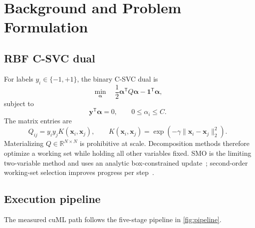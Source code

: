 \section{Background and Problem Formulation}

\subsection{RBF C-SVC dual}

For labels $y_i\in\{-1,+1\}$, the binary C-SVC dual is
\begin{equation}
  \min_{\bm{\alpha}}
  \quad
  \frac{1}{2}\bm{\alpha}^{\mathsf T}Q\bm{\alpha}
  -\bm{1}^{\mathsf T}\bm{\alpha},
  \label{eq:dual}
\end{equation}
subject to
\begin{equation}
  \bm{y}^{\mathsf T}\bm{\alpha}=0,
  \qquad
  0\leq \alpha_i\leq C.
  \label{eq:dual-constraints}
\end{equation}
The matrix entries are
\begin{equation}
  Q_{ij}=y_i y_j K(\bm{x}_i,\bm{x}_j),
  \qquad
  K(\bm{x}_i,\bm{x}_j)
  =\exp\!\left(-\gamma\lVert\bm{x}_i-\bm{x}_j\rVert_2^2\right).
  \label{eq:rbf}
\end{equation}
Materializing $Q\in\mathbb{R}^{N\times N}$ is prohibitive at scale.
Decomposition methods therefore optimize a working set while holding all
other variables fixed. SMO is the limiting two-variable method and uses an
analytic box-constrained update~\cite{platt1999smo}; second-order working-set
selection improves progress per step~\cite{fan2005working}.

\subsection{Execution pipeline}

The measured cuML path follows the five-stage pipeline in
\cref{fig:pipeline}.

